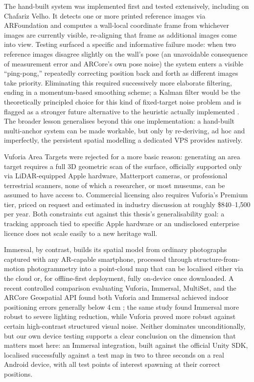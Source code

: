 \begin{aitemize}[nosep]
The hand-built system was implemented first and tested extensively,
including on Chafariz Velho. It detects one or more printed reference
images via ARFoundation and computes a wall-local coordinate frame from
whichever images are currently visible, re-aligning that frame as
additional images come into view. Testing surfaced a specific and
informative failure mode: when two reference images disagree slightly on
the wall's pose (an unavoidable consequence of measurement error and ARCore's own pose noise) the system enters a visible ``ping-pong,''
repeatedly correcting position back and forth as different images take
priority. Eliminating this required successively more elaborate
filtering, ending in a momentum-based smoothing scheme; a Kalman filter
would be the theoretically principled choice for this kind of fixed-target
noise problem and is flagged as a stronger future alternative to the
heuristic actually implemented \cite{kingmaba2015}. The broader lesson
generalises beyond this one implementation: a hand-built multi-anchor
system can be made workable, but only by re-deriving, ad hoc and
imperfectly, the persistent spatial modelling a dedicated VPS provides
natively.
 
Vuforia Area Targets were rejected for a more basic reason: generating
an area target requires a full 3D geometric scan of the surface,
officially supported only via LiDAR-equipped Apple hardware, Matterport
cameras, or professional terrestrial scanners, none of which a
researcher, or most museums, can be assumed to have access to. Commercial
licensing also requires Vuforia's Premium tier, priced on request and
estimated in industry discussion at roughly \$840--1{,}500 per year. Both
constraints cut against this thesis's generalisability goal: a tracking
approach tied to specific Apple hardware or an undisclosed enterprise
licence does not scale easily to a new heritage wall.
 
Immersal, by contrast, builds its spatial model from ordinary photographs
captured with any AR-capable smartphone, processed through
structure-from-motion photogrammetry into a point-cloud map that can be
localised either via the cloud or, for offline-first deployment, fully
on-device once downloaded. A recent controlled comparison evaluating
Vuforia, Immersal, MultiSet, and the ARCore Geospatial API found both
Vuforia and Immersal achieved indoor positioning errors generally below
4\,cm \cite{skabek2026}; the same study found Immersal more robust to
severe lighting reduction, while Vuforia proved more robust against
certain high-contrast structured visual noise. Neither dominates
unconditionally, but our own device testing supports a clear conclusion
on the dimension that matters most here: an Immersal integration, built
against the official Unity SDK, localised successfully against a test map
in two to three seconds on a real Android device, with all test points of
interest spawning at their correct positions.
 

\end{aitemize}
